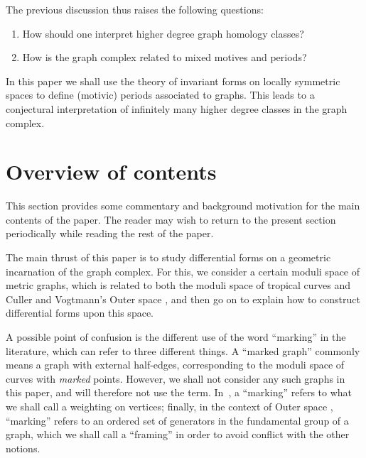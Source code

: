\documentclass[pdftex]{sigma}%
\numberwithin{equation}{section}
\newcommand{\0}{\color{blue}{\mathsf{0}}}
\begin{document}
The previous discussion thus raises the following questions:
\begin{enumerate}\itemsep=0pt
\item How should one interpret higher degree graph homology classes?
\item How is the graph complex related to mixed motives and periods?
\end{enumerate}

In this paper we shall use the theory of invariant forms on locally symmetric spaces to define (motivic) periods associated to graphs. This leads to a conjectural interpretation of infinitely many higher degree classes in the graph complex.

\section{Overview of contents}

This section provides some commentary and background motivation for the main contents of the paper. The reader may wish to return to the present section periodically while reading the rest of the paper.

The main thrust of this paper is to study differential forms on a geometric incarnation of the graph complex.
For this, we consider a certain moduli space of metric graphs, which is related to both the moduli space of tropical curves \cite{BMV} and Culler and Vogtmann's Outer space \cite{CullerVogtmann}, and then go on to explain how to construct differential forms upon this space.

A possible point of confusion is the different use of the word ``marking'' in the literature, which can refer to three different things. A ``marked graph'' commonly means a graph with external half-edges, corresponding to the moduli space of curves with \emph{marked} points. However, we shall not consider any such graphs in this paper, and will therefore not use the term. In~\cite{BMV}, a ``marking'' refers to what we shall call a weighting on vertices; finally, in the context of Outer space \cite{CullerVogtmann}, ``marking'' refers to an ordered set of generators in the fundamental group of a graph, which we shall call a ``framing'' in order to avoid conflict with the other notions.
\end{document}
